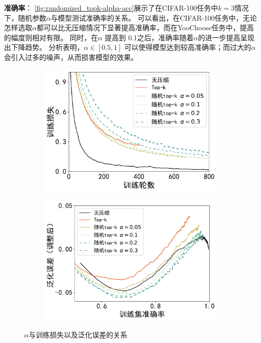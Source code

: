 \textbf{准确率}：
\autoref{fig:randomized_topk-alpha-acc}展示了在CIFAR-100任务中$k=3$情况下，随机参数$\alpha$与模型测试准确率的关系。
可以看出，在CIFAR-100任务中，无论怎样选取$\alpha$都可以比无压缩情况下显著提高准确率，而在YooChoose任务中，提高的幅度则相对有限。
同时，在$\alpha$ 提高到 0.1之后，准确率随着$\alpha$的进一步提高呈现出下降趋势。
%
分析表明，$\alpha \in [0.5, 1]$ 可以使得模型达到较高准确率；而过大的$\alpha$会引入过多的噪声，从而损害模型的效果。


\begin{figure}[h!]
    \centering
    \begin{subfigure}{0.45\linewidth}
        \includegraphics[width=1\linewidth]{Z_Resources/随机topk_cifar100-trainacc.pdf}
        \label{fig:randomized_topk-cifar-trainloss}
    \end{subfigure}
    \begin{subfigure}{0.47\linewidth}
        \includegraphics[width=1\linewidth]{Z_Resources/随机topk_cifar100-generror.pdf}
        \label{fig:randomized_topk-cifar-generror}
    \end{subfigure}
    \caption{$\alpha$与训练损失以及泛化误差的关系}
    \label{fig:randomized_topk-alpha-loss}
\end{figure}
